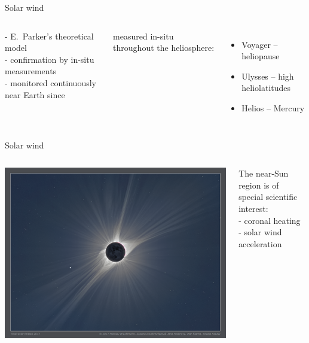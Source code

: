 \begin{frame}[plain,c]{Solar wind}{}
	\begin{columns}[c]
		
		- E.~Parker's theoretical model\\
		- confirmation by in-situ measurements\\
		- monitored continuously near Earth since
		
		
		measured in-situ throughout the heliosphere:
		\begin{itemize}
			\item Voyager -- heliopause
			\item Ulysses -- high heliolatitudes
			\item Helios -- Mercury
		\end{itemize}
		
	\end{columns}
\end{frame}
\begin{frame}[plain,c]{Solar wind}{}
	\begin{columns}[c]
		
		\hspace*{-17pt}
		\includegraphics[width=\textwidth]{../talk_figures/TSE_2017_200mm_Whiskey_m-d.png}
		
		
		The near-Sun region is of special scientific interest:\\
		- coronal heating\\
		- solar wind acceleration
		
	\end{columns}
\end{frame}

